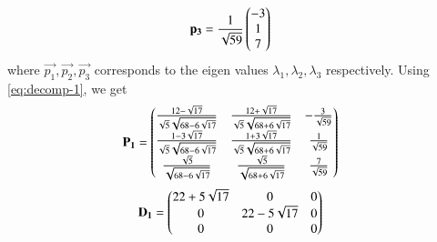 \documentclass[journal,12pt,twocolumn]{IEEEtran}
\begin{document}
\begin{enumerate}
\begin{enumerate}
\begin{align}
    \mathbf{p_3} &= \frac{1}{\sqrt{59}}\begin{pmatrix}-3\\1\\7\end{pmatrix}
\end{align}
where $\vec{p_1},\vec{p_2},\vec{p_3}$ corresponds to the  eigen values $\lambda_1, \lambda_2, \lambda_3$ respectively. Using \eqref{eq:decomp-1}, we get
\begin{align}
    \mathbf{P_1} &= \begin{pmatrix}\frac{12-\sqrt{17}}{\sqrt{5}\sqrt{68-6\sqrt{17}}} & \frac{12+\sqrt{17}}{\sqrt{5}\sqrt{68+6\sqrt{17}}} & -\frac{3}{\sqrt{59}}\\
    \frac{1-3\sqrt{17}}{\sqrt{5}\sqrt{68-6\sqrt{17}}}&\frac{1+3\sqrt{17}}{\sqrt{5}\sqrt{68+6\sqrt{17}}} & \frac{1}{\sqrt{59}}\\
\frac{\sqrt{5}}{\sqrt{68-6\sqrt{17}}}&\frac{\sqrt{5}}{\sqrt{68+6\sqrt{17}}} & \frac{7}{\sqrt{59}} \end{pmatrix}
    \label{eq:eig-params-1(a)}
\end{align}
\begin{align}
    \mathbf{D_1} &= \begin{pmatrix}22+5\sqrt{17}&0&0\\0&22-5\sqrt{17}&0\\0&0&0\end{pmatrix}
    \label{eq:eig-params-1(b)}
\end{align}


\end{enumerate}
\end{enumerate}
\end{document}

